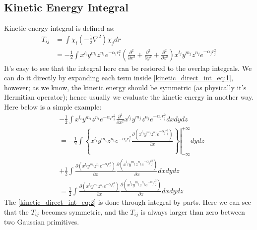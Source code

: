 \subsection{Kinetic Energy Integral}
%
%
%
Kinetic energy integral is defined as:
\begin{equation}
 \label{kinetic_direct_int_eq:1}
\begin{split}
 T_{ij} &= \int \chi_{i}(-\frac{1}{2}\nabla^{2})\chi_{j} dr \\
&= -\frac{1}{2} \int 
x^{l_{i}}y^{m_{i}}z^{n_{i}}e^{-\alpha_{i} r_{i}^{2}}
\left( 
  \frac{\partial^{2}}{\partial x^{2}}
+ \frac{\partial^{2}}{\partial y^{2}}
+ \frac{\partial^{2}}{\partial z^{2}}\right)
x^{l_{j}}y^{m_{j}}z^{n_{j}}e^{-\alpha_{j} r_{j}^{2}}
\end{split}
\end{equation}
It's easy to see that the integral here can be restored to the overlap integrals. We can do it directly
by expanding each term inside \ref{kinetic_direct_int_eq:1}, however; as we know, the kinetic energy should
be symmetric (as physically it's Hermitian operator); hence usually we evaluate the kinetic energy 
in another way. Here below is a simple example:
\begin{equation}
 \begin{split}
 & -\frac{1}{2} \int 
x^{l_{i}}y^{m_{i}}z^{n_{i}}e^{-\alpha_{i} r_{i}^{2}} 
  \frac{\partial^{2}}{\partial x^{2}}
x^{l_{j}}y^{m_{j}}z^{n_{j}}e^{-\alpha_{j} r_{j}^{2}} dxdydz \\
&=
-\frac{1}{2}  \int \left\lbrace 
x^{l_{i}}y^{m_{i}}z^{n_{i}}e^{-\alpha_{i} r_{i}^{2}}\left. 
\frac{\partial (x^{l_{j}}y^{m_{j}}z^{n_{j}}e^{-\alpha_{j} r_{j}^{2}})}{\partial x}
\right\rbrace 
\right|^{+\infty}_{-\infty} dydz
\\
&+ \frac{1}{2}  \int 
\frac{\partial (x^{l_{i}}y^{m_{i}}z^{n_{i}}e^{-\alpha_{i} r_{i}^{2}})}{\partial x}
\frac{\partial (x^{l_{j}}y^{m_{j}}z^{n_{j}}e^{-\alpha_{j} r_{j}^{2}})}{\partial x} dxdydz \\
&= \frac{1}{2}  \int 
\frac{\partial (x^{l_{i}}y^{m_{i}}z^{n_{i}}e^{-\alpha_{i} r_{i}^{2}})}{\partial x}
\frac{\partial (x^{l_{j}}y^{m_{j}}z^{n_{j}}e^{-\alpha_{j} r_{j}^{2}})}{\partial x} dxdydz
 \end{split}
\label{kinetic_direct_int_eq:2}
\end{equation}
The \ref{kinetic_direct_int_eq:2} is done through integral by parts. Here we can see that the $T_{ij}$
becomes symmetric, and the $T_{ij}$ is always larger than zero between two Gaussian primitives.

